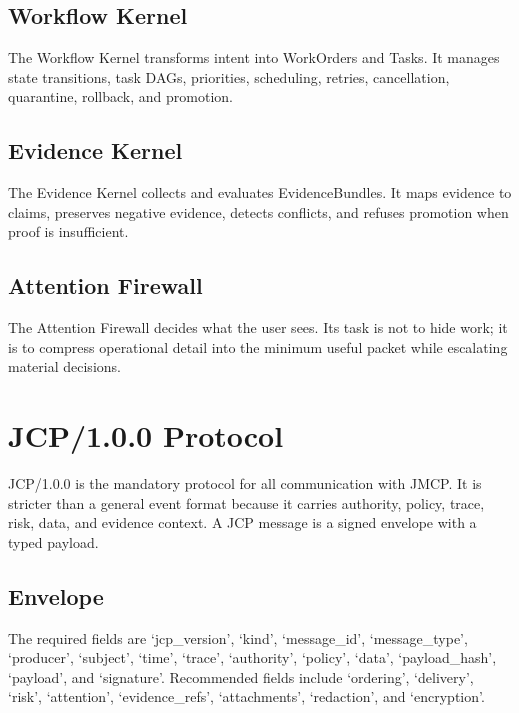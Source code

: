 \documentclass[12pt,journal,onecolumn,draftclsnofoot]{IEEEtran}
\begin{document}
\subsection{Workflow Kernel}
The Workflow Kernel transforms intent into WorkOrders and Tasks. It manages state transitions, task DAGs, priorities, scheduling, retries, cancellation, quarantine, rollback, and promotion.

\subsection{Evidence Kernel}
The Evidence Kernel collects and evaluates EvidenceBundles. It maps evidence to claims, preserves negative evidence, detects conflicts, and refuses promotion when proof is insufficient.

\subsection{Attention Firewall}
The Attention Firewall decides what the user sees. Its task is not to hide work; it is to compress operational detail into the minimum useful packet while escalating material decisions.

\section{JCP/1.0.0 Protocol}
JCP/1.0.0 is the mandatory protocol for all communication with JMCP. It is stricter than a general event format because it carries authority, policy, trace, risk, data, and evidence context. A JCP message is a signed envelope with a typed payload.

\subsection{Envelope}
The required fields are `jcp\_version', `kind', `message\_id', `message\_type', `producer', `subject', `time', `trace', `authority', `policy', `data', `payload\_hash', `payload', and `signature'. Recommended fields include `ordering', `delivery', `risk', `attention', `evidence\_refs', `attachments', `redaction', and `encryption'.
\end{document}
